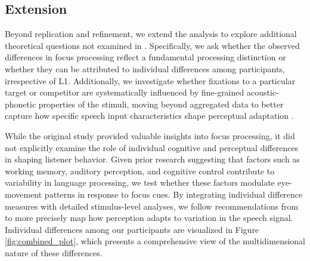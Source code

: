 \subsection{Extension}

Beyond replication and refinement, we extend the analysis to explore additional theoretical questions not examined in \cite{Ge2021}. Specifically, we ask whether the observed differences in focus processing reflect a fundamental processing distinction or whether they can be attributed to individual differences among participants, irrespective of L1. Additionally, we investigate whether fixations to a particular target or competitor are systematically influenced by fine-grained acoustic-phonetic properties of the stimuli, moving beyond aggregated data to better capture how specific speech input characteristics shape perceptual adaptation \citep{xie2023adaptive}.

While the original study provided valuable insights into focus processing, it did not explicitly examine the role of individual cognitive and perceptual differences in shaping listener behavior. Given prior research suggesting that factors such as working memory, auditory perception, and cognitive control contribute to variability in language processing, we test whether these factors modulate eye-movement patterns in response to focus cues. By integrating individual difference measures with detailed stimulus-level analyses, we follow recommendations from \cite{xie2023adaptive} to more precisely map how perception adapts to variation in the speech signal. Individual differences among our participants are visualized in Figure \ref{fig:combined_plot}, which presents a comprehensive view of the multidimensional nature of these differences. 

